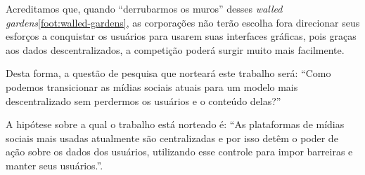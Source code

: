 Acreditamos que, quando ``derrubarmos os muros'' desses \textit{walled gardens}\ref{foot:walled-gardens}, as corporações não terão escolha fora direcionar seus esforços a conquistar os usuários para usarem suas interfaces gráficas, pois graças aos dados descentralizados, a competição poderá surgir muito mais facilmente.


Desta forma, a questão de pesquisa que norteará este trabalho será: ``Como podemos transicionar as mídias sociais atuais para um modelo mais descentralizado sem perdermos os usuários e o conteúdo delas?''

A hipótese sobre a qual o trabalho está norteado é: ``As plataformas de mídias sociais mais usadas atualmente são centralizadas e por isso detêm o poder de ação sobre os dados dos usuários, utilizando esse controle para impor barreiras e manter seus usuários.''.




